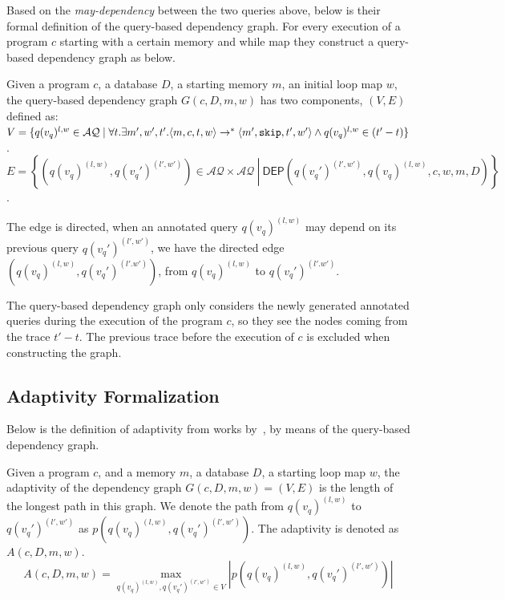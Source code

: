 %
Based on the \emph{may-dependency} between the two queries above,
below is their formal definition of the query-based dependency graph. 
For every execution of a program $c$ starting with a certain memory and while map
they construct a query-based dependency graph as below.
\begin{defn}
Given a program $c$, a database $D$, a starting memory $m$, an initial loop map $w$, the query-based dependency graph $G(c,D,m,w)$ has two components, $(V, E)$ defined as: \\
$V =\{q({v_q})^{l,w} \in \mathcal{AQ} \mid \forall t. \exists m', w', t'. \langle m ,c, t, w \rangle \to^{*} \langle m' , \mathtt{skip}, t', w'  \rangle \land q({v_q})^{l,w} \in {(t'-t)} \}$.
\\
$E = \left\{(q({v_q})^{(l,w)},q({v_q}')^{(l',w')}) \in \mathcal{AQ} \times \mathcal{AQ} 
~ \left \vert ~ \mathsf{DEP}(q({v_q}')^{(l',w')},q({v_q})^{(l,w)}, c,w,m,D)
 \right.\right\}$.
\end{defn}
%
The edge is directed, when an annotated query $q({v_q})^{(l,w)}$ may depend on its previous query $q({v_q}')^{(l',w')}$, we have the directed
edge $(q({v_q})^{(l,w)}, q({v_q}')^{(l'.w')})$, from $q({v_q})^{(l,w)} $ to $q({v_q}')^{(l'.w')}$.

The query-based dependency graph only considers the newly generated annotated queries during the execution of the program $c$,
so they see the nodes coming from the trace $t'-t$.
The previous trace before the execution of $c$ is excluded when constructing the graph.

\subsection{Adaptivity Formalization}
Below is the definition of adaptivity from works by~\cite{weihao22}, by means of the query-based dependency graph. 
\begin{defn}
Given a program $c$, and a memory $m$, a database $D$, a starting loop map $w$, the adaptivity of the dependency graph $G(c, D,m,w) = (V, E)$ is the length of the longest path in this graph. We denote the path from $q({v_q})^{(l,w)}$ to $q({v_q}')^{(l',w')}$ as $p(q({v_q})^{(l,w)}, q({v_q}')^{(l',w')} )$. The adaptivity is denoted as $A(c, D, m, w)$.
%
$$A(c, D, m, w) = \max\limits_{q({v_q})^{(l,w)},q({v_q}')^{(l',w')} \in V } |p(q({v_q})^{(l,w)}, q({v_q}')^{(l',w')} )| $$
\end{defn}

